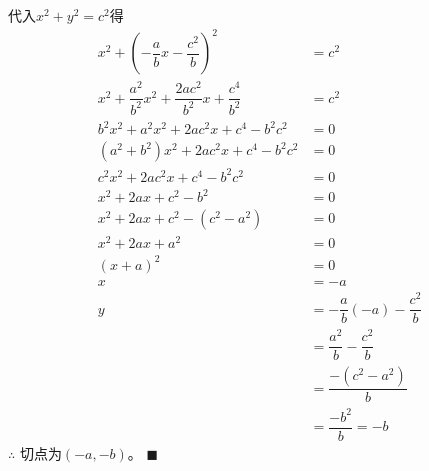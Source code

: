 \documentclass[10pt]{article}
\begin{document}
\begin{enumerate}[leftmargin=*]
        代入$x^{2} + y^{2} = c^{2}$得
        \begin{align*}
          x^{2} + \left(-\dfrac{a}{b}x - \dfrac{c^{2}}{b}\right)^{2}                         & = c^{2}                                \\
          x^{2} + \dfrac{a^{2}}{b^{2}}x^{2} + \dfrac{2ac^{2}}{b^{2}}x + \dfrac{c^{4}}{b^{2}} & = c^{2}                                \\
          b^2x^{2} + a^{2}x^{2} + 2ac^{2}x + c^{4} - b^{2}c^{2}                              & = 0                                    \\
          (a^{2} + b^{2})x^{2} + 2ac^{2}x + c^{4} - b^{2}c^{2}                               & = 0                                    \\
          c^2x^{2} + 2ac^{2}x + c^{4} - b^{2}c^{2}                                           & = 0                                    \\
          x^{2} + 2ax + c^{2} - b^{2}                                                        & = 0                                    \\
          x^{2} + 2ax + c^{2} -(c^{2} - a^{2})                                               & = 0                                    \\
          x^2 + 2ax + a^{2}                                                                  & = 0                                    \\
          (x + a)^{2}                                                                        & = 0                                    \\
          x                                                                                  & = -a                                   \\
          y                                                                                  & = -\dfrac{a}{b}(-a) - \dfrac{c^{2}}{b} \\
                                                                                             & = \dfrac{a^{2}}{b} - \dfrac{c^{2}}{b}  \\
                                                                                             & = \dfrac{-(c^2 - a^2)}{b}              \\
                                                                                             & = \dfrac{-b^2}{b} = -b
        \end{align*}
        $\therefore$ 切点为$(-a, -b)$。 \hfill$\blacksquare$


\end{enumerate}
\end{document}
